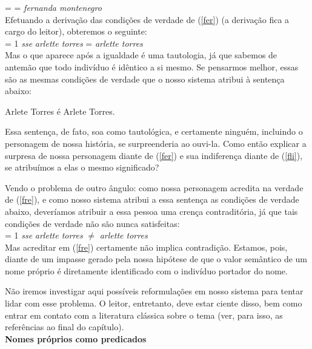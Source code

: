 \n{} =  = \textit{fernanda montenegro}\\

\n Efetuando a derivação das condições de verdade de (\ref{fer})
(a derivação fica a cargo do leitor), obteremos o seguinte:\\

\n\den{(\ref{fer})} = 1 \textit{sse} \textit{arlette torres} = \textit{arlette torres}\\

\n Mas o que aparece após a igualdade é uma tautologia, já que
sabemos de antemão que todo indivíduo é idêntico a si mesmo. Se
pensarmos melhor, essas são as mesmas condições de verdade que o
nosso sistema atribui à sentença abaixo:

\begin{exe}
\ex Arlete Torres é Arlete Torres.\label{fli}
\end{exe}

\n Essa sentença, de fato, soa como tautológica, e certamente
ninguém, incluindo o personagem de nossa história, se
surpreenderia ao ouvi-la.  Como então explicar a surpresa de
nossa personagem diante de (\ref{fer}) e sua indiferença diante de
(\ref{fli}), se atribuímos a elas o mesmo significado?

Vendo o problema de outro ângulo: como nossa personagem
acredita na verdade de (\ref{fre}), e como nosso sistema atribui a
essa sentença as condições de verdade abaixo, deveríamos atribuir
a essa pessoa uma crença contraditória, já que
tais condições de verdade não são nunca satisfeitas:\\

\n\den{(\ref{fer})} = 1 \textit{sse} \textit{arlette torres} $\neq$ \textit{arlette torres}\\

\n Mas acreditar em (\ref{fre}) certamente não implica
contradição. Estamos, pois, diante de um impasse gerado pela nossa
hipótese de que o valor semântico de um nome próprio é diretamente
identificado com o indivíduo portador do nome.

Não iremos investigar aqui possíveis reformulações em nosso
sistema para tentar lidar com esse problema. O leitor, entretanto,
deve estar ciente disso, bem como entrar em contato com a
literatura clássica sobre o tema (ver, para isso, as referências
ao final do capítulo). \\



\n \textbf{Nomes próprios como predicados} \\

